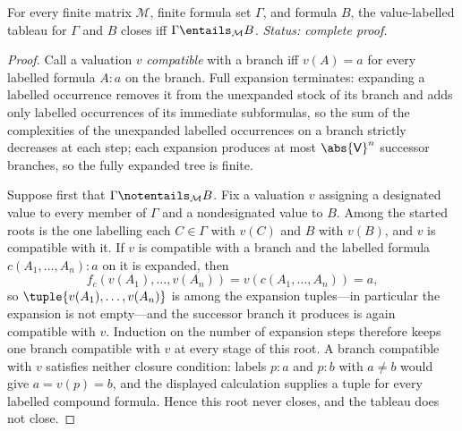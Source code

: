 \begin{theorem}
For every finite matrix \(\mathcal M\), finite formula set \(\Gamma\), and
formula \(B\), the value-labelled tableau for \(\Gamma\) and \(B\) closes
iff \(\Gamma\entails_{\mathcal M}B\).
\textit{Status: complete proof.}
\end{theorem}

\begin{proof}
Call a valuation \(v\) \emph{compatible} with a branch iff \(v(A)=a\) for
every labelled formula \(A{:}a\) on the branch.  Full expansion terminates:
expanding a labelled occurrence removes it from the unexpanded stock of its
branch and adds only labelled occurrences of its immediate subformulas, so
the sum of the complexities of the unexpanded labelled occurrences on a
branch strictly decreases at each step; each expansion produces at most
\(\abs{\mathsf V}^{n}\) successor branches, so the fully expanded tree is
finite.

Suppose first that \(\Gamma\notentails_{\mathcal M}B\).  Fix a valuation
\(v\) assigning a designated value to every member of \(\Gamma\) and a
nondesignated value to \(B\).  Among the started roots is the one labelling
each \(C\in\Gamma\) with \(v(C)\) and \(B\) with \(v(B)\), and \(v\) is
compatible with it.  If \(v\) is compatible with a branch and the labelled
formula \(c(A_1,\ldots,A_n){:}a\) on it is expanded, then
\[
  f_c(v(A_1),\ldots,v(A_n))=v(c(A_1,\ldots,A_n))=a,
\]
so \(\tuple{v(A_1),\ldots,v(A_n)}\) is among the expansion tuples---in
particular the expansion is not empty---and the successor branch it produces
is again compatible with \(v\).  Induction on the number of expansion steps
therefore keeps one branch compatible with \(v\) at every stage of this
root.  A branch compatible with \(v\) satisfies neither closure condition:
labels \(p{:}a\) and \(p{:}b\) with \(a\ne b\) would give \(a=v(p)=b\), and
the displayed calculation supplies a tuple for every labelled compound
formula.  Hence this root never closes, and the tableau does not close.


\end{proof}
